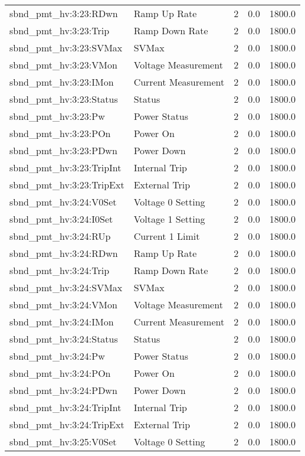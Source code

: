 \begin{center}
\begin{longtable}{l | l l l l }
sbnd\_pmt\_hv:3:23:RDwn & Ramp Up Rate & 2 & 0.0 & 1800.0\\ 
sbnd\_pmt\_hv:3:23:Trip & Ramp Down Rate & 2 & 0.0 & 1800.0\\ 
sbnd\_pmt\_hv:3:23:SVMax & SVMax & 2 & 0.0 & 1800.0\\ 
sbnd\_pmt\_hv:3:23:VMon & Voltage Measurement & 2 & 0.0 & 1800.0\\ 
sbnd\_pmt\_hv:3:23:IMon & Current Measurement & 2 & 0.0 & 1800.0\\ 
sbnd\_pmt\_hv:3:23:Status & Status & 2 & 0.0 & 1800.0\\ 
sbnd\_pmt\_hv:3:23:Pw & Power Status & 2 & 0.0 & 1800.0\\ 
sbnd\_pmt\_hv:3:23:POn & Power On & 2 & 0.0 & 1800.0\\ 
sbnd\_pmt\_hv:3:23:PDwn & Power Down & 2 & 0.0 & 1800.0\\ 
sbnd\_pmt\_hv:3:23:TripInt & Internal Trip & 2 & 0.0 & 1800.0\\ 
sbnd\_pmt\_hv:3:23:TripExt & External Trip & 2 & 0.0 & 1800.0\\ 
sbnd\_pmt\_hv:3:24:V0Set & Voltage 0 Setting & 2 & 0.0 & 1800.0\\ 
sbnd\_pmt\_hv:3:24:I0Set & Voltage 1 Setting & 2 & 0.0 & 1800.0\\ 
sbnd\_pmt\_hv:3:24:RUp & Current 1 Limit & 2 & 0.0 & 1800.0\\ 
sbnd\_pmt\_hv:3:24:RDwn & Ramp Up Rate & 2 & 0.0 & 1800.0\\ 
sbnd\_pmt\_hv:3:24:Trip & Ramp Down Rate & 2 & 0.0 & 1800.0\\ 
sbnd\_pmt\_hv:3:24:SVMax & SVMax & 2 & 0.0 & 1800.0\\ 
sbnd\_pmt\_hv:3:24:VMon & Voltage Measurement & 2 & 0.0 & 1800.0\\ 
sbnd\_pmt\_hv:3:24:IMon & Current Measurement & 2 & 0.0 & 1800.0\\ 
sbnd\_pmt\_hv:3:24:Status & Status & 2 & 0.0 & 1800.0\\ 
sbnd\_pmt\_hv:3:24:Pw & Power Status & 2 & 0.0 & 1800.0\\ 
sbnd\_pmt\_hv:3:24:POn & Power On & 2 & 0.0 & 1800.0\\ 
sbnd\_pmt\_hv:3:24:PDwn & Power Down & 2 & 0.0 & 1800.0\\ 
sbnd\_pmt\_hv:3:24:TripInt & Internal Trip & 2 & 0.0 & 1800.0\\ 
sbnd\_pmt\_hv:3:24:TripExt & External Trip & 2 & 0.0 & 1800.0\\ 
sbnd\_pmt\_hv:3:25:V0Set & Voltage 0 Setting & 2 & 0.0 & 1800.0\\ 

\end{longtable}
\end{center}
